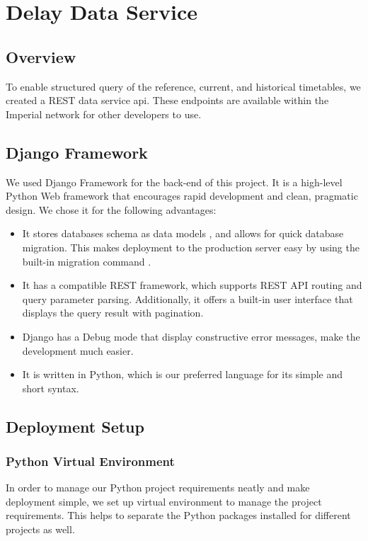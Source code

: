\chapter{Delay Data Service}
\label{ch:data_service}
\section{Overview}
\par To enable structured query of the reference, current, and historical timetables, we created a REST data service \acrshort{api}. These endpoints are available within the Imperial network for other developers to use.

\section{Django Framework}
\par We used Django Framework \cite{django_framework} for the back-end of this project. It is a high-level Python Web framework that encourages rapid development and clean, pragmatic design. We chose it for the following advantages:

\begin{itemize}
  \item It stores databases schema as data models \cite{django_model}, and allows for quick database migration. This makes deployment to the production server easy by using the built-in migration command \cite{django_migrations}.
  \item It has a compatible REST framework\cite{django_rest}, which supports REST API routing\cite{django_rest_routing} and query parameter parsing. Additionally, it offers a built-in user interface that displays the query result with pagination\cite{django_rest_pagination}.
  \item Django has a Debug mode that display constructive error messages, make the development much easier.
  \item It is written in Python, which is our preferred language for its simple and short syntax.
\end{itemize}

\section{Deployment Setup}
\subsection{Python Virtual Environment}
\par In order to manage our Python project requirements neatly and make deployment simple, we set up virtual environment\cite{virtualenv} \cite{virtualenvwrapper} to manage the project requirements. This helps to separate the Python packages installed for different projects as well.

